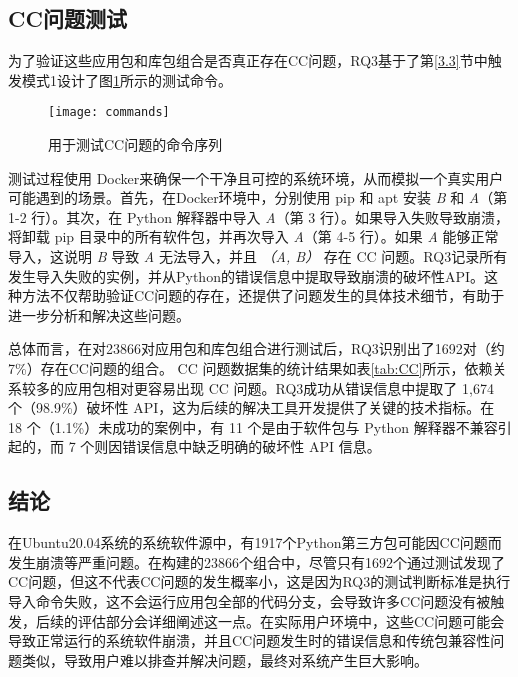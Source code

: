 \subsection{CC问题测试}
为了验证这些应用包和库包组合是否真正存在CC问题，RQ3基于了第\ref{3.3}节中触发模式1设计了图\ref{fig:command}所示的测试命令。
\begin{figure}[htbp] %
	\centering
	\texttt{[image: commands]}
	\caption{用于测试CC问题的命令序列}
	\label{fig:command}
\end{figure}

测试过程使用 Docker来确保一个干净且可控的系统环境，从而模拟一个真实用户可能遇到的场景。首先，在Docker环境中，分别使用 pip 和 apt 安装 \textit{B} 和 \textit{A}（第 1-2 行）。其次，在 Python 解释器中导入 \textit{A}（第 3 行）。如果导入失败导致崩溃，将卸载 pip 目录中的所有软件包，并再次导入 \textit{A}（第 4-5 行）。如果 \textit{A} 能够正常导入，这说明 \textit{B} 导致 \textit{A} 无法导入，并且 \textit{（A, B）} 存在 CC 问题。RQ3记录所有发生导入失败的实例，并从Python的错误信息中提取导致崩溃的破坏性API。这种方法不仅帮助验证CC问题的存在，还提供了问题发生的具体技术细节，有助于进一步分析和解决这些问题。

总体而言，在对23866对应用包和库包组合进行测试后，RQ3识别出了1692对（约7\%）存在CC问题的组合。
CC 问题数据集的统计结果如表\ref{tab:CC}所示，依赖关系较多的应用包相对更容易出现 CC 问题。RQ3成功从错误信息中提取了 1,674 个（98.9\%）破坏性 API，这为后续的解决工具开发提供了关键的技术指标。在 18 个（1.1\%）未成功的案例中，有 11 个是由于软件包与 Python 解释器不兼容引起的，而 7 个则因错误信息中缺乏明确的破坏性 API 信息。


\subsection{结论}
在Ubuntu20.04系统的系统软件源中，有1917个Python第三方包可能因CC问题而发生崩溃等严重问题。在构建的23866个组合中，尽管只有1692个通过测试发现了CC问题，但这不代表CC问题的发生概率小，这是因为RQ3的测试判断标准是执行导入命令失败，这不会运行应用包全部的代码分支，会导致许多CC问题没有被触发，后续的评估部分会详细阐述这一点。在实际用户环境中，这些CC问题可能会导致正常运行的系统软件崩溃，并且CC问题发生时的错误信息和传统包兼容性问题类似，导致用户难以排查并解决问题，最终对系统产生巨大影响。

